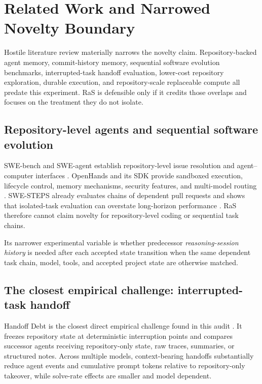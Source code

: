 \section{Related Work and Narrowed Novelty Boundary}
\label{sec:related}

Hostile literature review materially narrows the novelty claim. Repository-backed agent memory, commit-history memory, sequential software evolution benchmarks, interrupted-task handoff evaluation, lower-cost repository exploration, durable execution, and repository-scale replaceable compute all predate this experiment. RaS is defensible only if it credits those overlaps and focuses on the treatment they do not isolate.

\subsection{Repository-level agents and sequential software evolution}

SWE-bench and SWE-agent establish repository-level issue resolution and agent--computer interfaces \citep{jimenez2024swebench,yang2024sweagent}. OpenHands and its SDK provide sandboxed execution, lifecycle control, memory mechanisms, security features, and multi-model routing \citep{wang2024openhands,wang2025openhandsSDK}. SWE-STEPS already evaluates chains of dependent pull requests and shows that isolated-task evaluation can overstate long-horizon performance \citep{shastry2026swesteps}. RaS therefore cannot claim novelty for repository-level coding or sequential task chains.

Its narrower experimental variable is whether predecessor \emph{reasoning-session history} is needed after each accepted state transition when the same dependent task chain, model, tools, and accepted project state are otherwise matched.

\subsection{The closest empirical challenge: interrupted-task handoff}

Handoff Debt is the closest direct empirical challenge found in this audit \citep{kc2026handoff}. It freezes repository state at deterministic interruption points and compares successor agents receiving repository-only state, raw traces, summaries, or structured notes. Across multiple models, context-bearing handoffs substantially reduce agent events and cumulative prompt tokens relative to repository-only takeover, while solve-rate effects are smaller and model dependent.

